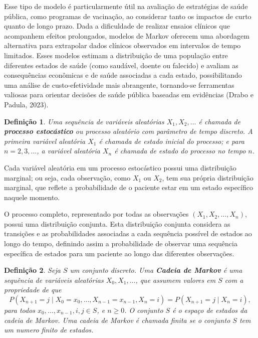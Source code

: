 \documentclass[12pt, a4paper, openany]{book}
\numberwithin{equation}{chapter}
\numberwithin{table}{chapter}
\numberwithin{figure}{chapter}
\theoremstyle{break}
\newtheorem{definition}{Defini\c{c}\~ao}[section]
\begin{document}
Esse tipo de modelo é particularmente útil na avaliação de estratégias de saúde pública, como programas de vacinação, ao considerar tanto os impactos de curto quanto de longo prazo. Dada a dificuldade de realizar ensaios clínicos que acompanhem efeitos prolongados, modelos de Markov oferecem uma abordagem alternativa para extrapolar dados clínicos observados em intervalos de tempo limitados. Esses modelos estimam a distribuição de uma população entre diferentes estados de saúde (como saudável, doente ou falecido) e avaliam as consequências econômicas e de saúde associadas a cada estado, possibilitando uma análise de custo-efetividade mais abrangente, tornando-se ferramentas valiosas para orientar decisões de saúde pública baseadas em evidências (Drabo e Padula, 2023).






\begin{definition}
Uma sequência de variáveis aleatórias \( X_1, X_2, \dots \) é chamada de \textbf{processo estocástico} ou \textit{processo aleatório} com parâmetro de tempo discreto.  A primeira variável aleatória \( X_1 \) é chamada de \textit{estado inicial} do processo; e para \( n = 2, 3, \dots \), a variável aleatória \( X_n \) é chamada de \textit{estado do processo no tempo \( n \)}. 
\end{definition}


Cada variável aleatória em um processo estocástico possui uma distribuição marginal; ou seja, cada observação, como \( X_1 \) ou \( X_2 \), tem sua própria distribuição marginal, que reflete a probabilidade de o paciente estar em um estado específico naquele momento.

O processo completo, representado por todas as observações \( (X_1, X_2, \dots, X_n) \), possui uma distribuição conjunta. Esta distribuição conjunta considera as transições e as probabilidades associadas a cada sequência possível de estados ao longo do tempo, definindo assim a probabilidade de observar uma sequência específica de estados para um paciente ao longo das diferentes observações.






\begin{definition}{}
Seja \( S \) um conjunto discreto. Uma \textbf{Cadeia de Markov} é uma sequência de variáveis aleatórias \( X_0, X_1, \dots \), que assumem valores em \( S \) com a propriedade de que
\[
P(X_{n+1} = j \mid X_0 = x_0, \dots, X_{n-1} = x_{n-1}, X_n = i) = P(X_{n+1} = j \mid X_n = i),
\]
para todos \( x_0, \dots, x_{n-1}, i, j \in S \), e \( n \geq 0 \). O conjunto \( S \) é o espaço de estados da cadeia de Markov. Uma cadeia de Markov é chamada finita se o conjunto $S$ tem um numero finito de estados.
\end{definition}
\end{document}
